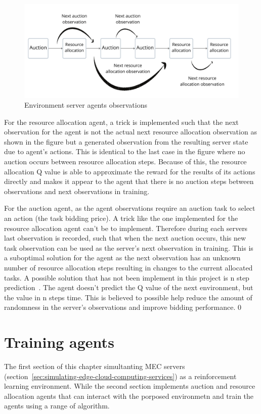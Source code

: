\begin{figure}
    \centering
    \includegraphics[width=14cm]{figures/env_server_agents_observations.pdf}
    \caption{Environment server agents observations}
    \label{fig:environment-observations}
\end{figure}

For the resource allocation agent, a trick is implemented such that the next observation for the agent is not the
actual next resource allocation observation as shown in the figure but a generated observation from the resulting
server state due to agent's actions. This is identical to the last case in the figure where no auction occurs between
resource allocation steps. Because of this, the resource allocation Q value is able to approximate the reward for the
results of its actions directly and makes it appear to the agent that there is no auction steps between observations
and next observations in training.

For the auction agent, as the agent observations require an auction task to select an action (the task
bidding price). A trick like the one implemented for the resource allocation agent can't be to implement.
Therefore during each servers last observation is recorded, such that when the next auction occurs, this new task
observation can be used as the server's next observation in training. This is a suboptimal solution for the agent as the next observation
has an unknown number of resource allocation steps resulting in changes to the current allocated tasks.
A possible solution that has not been implement in this project is n step prediction~\citep{multi-step-dqn}. The agent
doesn't predict the Q value of the next environment, but the value in n steps time. This is believed to possible help
reduce the amount of randomness in the server's observations and improve bidding performance. 0

\section{Training agents}\label{sec:training-agents}
The first section of this chapter simultanting MEC servers (section~\ref{sec:simulating-edge-cloud-computing-services})
as a reinforcement learning environment. While the second section implements auction and resource allocation agents that
can interact with the porposed environmetn and train the agents using a range of algorithm. 

